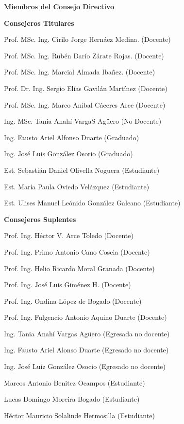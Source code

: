 \pagestyle{fancy}
\begin{center}
\textbf{Miembros del Consejo Directivo}
\end{center}
	\vspace{-5mm}
	
\begin{center}
\textbf{Consejeros Titulares}

Prof. MSc. Ing. Cirilo Jorge Hern\'aez Medina. (Docente)

Prof. MSc. Ing. Rub\'en Dar\'io Z\'arate Rojas. (Docente)

Prof. MSc. Ing. Marcial Almada Iba\~nez. (Docente)

Prof. Dr. Ing. Sergio El\'ias Gavil\'an Mart\'inez  (Docente)

Prof. MSc. Ing. Marco An\'ibal C\'aceres Arce  (Docente)

Ing. MSc. Tania Anah\'i VargaS Ag\"uero (No Docente)




Ing. Fausto Ariel Alfonso Duarte (Graduado)

Ing. José Luis Gonz\'alez Osorio (Graduado)

Est. Sebasti\'an Daniel Olivella Noguera (Estudiante)

Est. Mar\'ia Paula Oviedo Vel\'azquez (Estudiante)

Est. Ulises Manuel Le\'onido Gonz\'alez Galeano (Estudiante)
	
	\vspace{5mm}
\end{center}
 
\begin{center}
	\textbf{Consejeros Suplentes }
 
	
Prof. Ing. Héctor V. Arce Toledo (Docente)

Prof. Ing. Primo Antonio Cano Coscia (Docente)

Prof. Ing. Helio Ricardo Moral Granada (Docente)

Prof. Ing. José Luis Giménez H. (Docente)

Prof. Ing. Ondina López de Bogado (Docente)

Prof. Ing. Fulgencio Antonio Aquino Duarte (Docente)

Ing. Tania Anahí Vargas Agüero (Egresada no docente)

Ing. Fausto Ariel Alonso Duarte (Egresado no docente)

Ing. José Luíz González Osocio (Egresado no docente)

Marcos Antonio Benitez Ocampos (Estudiante)

Lucas Domingo Moreira Bogado (Estudiante)

Héctor Mauricio Solalinde Hermosilla (Estudiante)

\end{center}
	